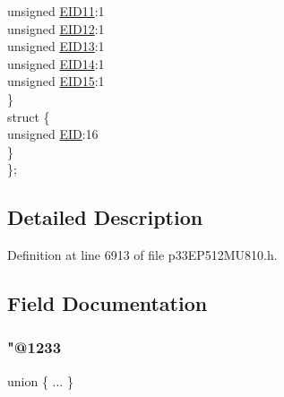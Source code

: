 \begin{DoxyCompactItemize}
\begin{tabbing}
\>\>unsigned \hyperlink{structtag_c2_r_x_f12_e_i_d_b_i_t_s_a710bdb0d602deb021b0be99066008018}{EID11}:1\\
\>\>unsigned \hyperlink{structtag_c2_r_x_f12_e_i_d_b_i_t_s_aa347bb85867bd8d4e0124f7cff8c6472}{EID12}:1\\
\>\>unsigned \hyperlink{structtag_c2_r_x_f12_e_i_d_b_i_t_s_a37d5f3edcbf6ef62f848fd4f3c584f79}{EID13}:1\\
\>\>unsigned \hyperlink{structtag_c2_r_x_f12_e_i_d_b_i_t_s_a7ffc0b0e0d99b8476b6f9a45337c17ab}{EID14}:1\\
\>\>unsigned \hyperlink{structtag_c2_r_x_f12_e_i_d_b_i_t_s_a293cd7dc1746257fa75a60cbd9383cd7}{EID15}:1\\
\>\} \\
\>struct \{\\
\>\>unsigned \hyperlink{structtag_c2_r_x_f12_e_i_d_b_i_t_s_ae80b378c9141f7c03e0b4e55b5f4b54d}{EID}:16\\
\>\} \\
\}; \\

\end{tabbing}\end{DoxyCompactItemize}


\subsection{Detailed Description}


Definition at line 6913 of file p33\+E\+P512\+M\+U810.\+h.



\subsection{Field Documentation}
\mbox{\label{structtag_c2_r_x_f12_e_i_d_b_i_t_s_a931e16fd9497e0228a6e6ebc73c73e73}} 
\subsubsection{\texorpdfstring{"@1233}{@1233}}
{\footnotesize\ttfamily union \{ ... \} }

\mbox{\label{structtag_c2_r_x_f12_e_i_d_b_i_t_s_ae80b378c9141f7c03e0b4e55b5f4b54d}} 
